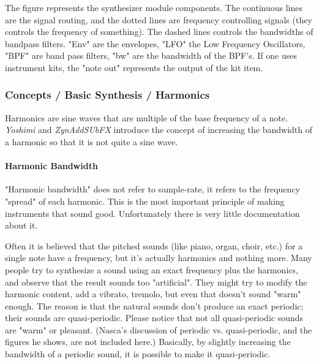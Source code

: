    The figure represents the synthesizer module components. The continuous
   lines are the signal routing, and the dotted lines are frequency
   controlling signals (they controls the frequency of something).  The
   dashed lines controls the bandwidths of bandpass filters. "Env" are the
   envelopes, "LFO" the Low Frequency Oscillators, "BPF" are band pass
   filters, "bw" are the bandwidth of the BPF's.  If one uses instrument kits,
   the "note out" represents the output of the kit item.

\subsubsection{Concepts / Basic Synthesis / Harmonics}
\label{subsubsec:concepts_basics_harmonics}

   Harmonics are sine waves that are multiple of the base frequency of a
   note.  \textsl{Yoshimi} and \textsl{ZynAddSUbFX} introduce the concept of
   increasing the bandwidth of a harmonic so that it is not quite a sine
   wave.

\paragraph{Harmonic Bandwidth}
\label{paragraph:concepts_basics_harmonic_bandwidth}

   "Harmonic bandwidth" does not refer to sample-rate, it refers to the
   frequency "spread" of each harmonic. This is the most important principle
   of making instruments that sound good. Unfortunately there is very little
   documentation about it.
    
   Often it is believed that the pitched sounds (like piano, organ, choir,
   etc.) for a single note have a frequency, but it's actually
   harmonics and nothing more. Many people try to synthesize a sound using an
   exact frequency plus the harmonics, and observe that the result sounds too
   "artificial".  They might try to modify the harmonic content, add a
   vibrato, tremolo, but even that doesn't sound "warm" enough. The reason is
   that the natural sounds don't produce an exact periodic; their sounds are
   quasi-periodic.  Please notice that not all quasi-periodic sounds are
   "warm" or pleasant.
   (Nasca's discussion of periodic vs. quasi-periodic,
   and the figures he shows, are not included here.)
   Basically, by slightly increasing the bandwidth of a periodic sound, it
   is possible to make it quasi-periodic.

